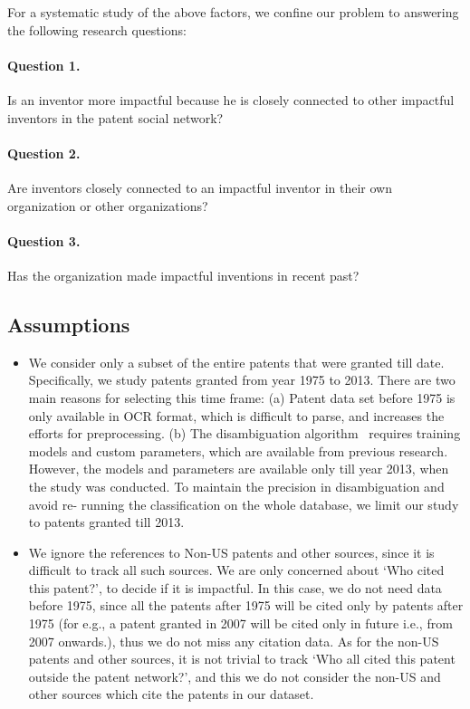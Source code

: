 For a systematic study of the above factors, we confine our problem to
answering the following research questions:

\paragraph{Question 1.} Is an inventor more impactful because he is closely
connected to other impactful inventors in the patent social network? 

\paragraph{Question  2.} Are inventors closely connected to an impactful
inventor in their own organization or other organizations? %

\paragraph{Question  3.} Has the organization made impactful inventions in
recent past? %


\subsection{Assumptions}
\label{sec:assumptions}
	\begin{itemize}
	\squish
		\item We consider only a subset of the entire patents that were granted till
		date. Specifically, we study patents granted from year 1975 to 2013. There are
		two main reasons for selecting this time frame: (a) Patent data set before
		1975 is only available in OCR format, which is difficult to parse, and
		increases the efforts for preprocessing. (b) The disambiguation
		algorithm~\cite{disambiguation}  requires training models and custom
		parameters, which are available from previous research. However, the models
		and parameters are available only till year 2013, when the study was
		conducted. To maintain the precision in disambiguation and avoid re- running
		the classification on the whole database, we limit our study to patents
		granted till 2013.
		\item We ignore the references to Non-US patents and other sources, since it
		is difficult to track all such sources.  We are only concerned about `Who
		cited this patent?', to decide if it is impactful. In this case, we do not
		need data before 1975, since all the patents after 1975 will be cited only by
		patents after 1975 (for e.g., a patent granted in 2007 will be cited only in
		future i.e., from 2007 onwards.), thus we do not miss any citation data. As
		for the non-US patents and other sources, it is not trivial to track `Who all
		cited this patent outside the patent network?', and this we do not consider
		the non-US and other sources which cite the patents in our dataset.

	\end{itemize}

